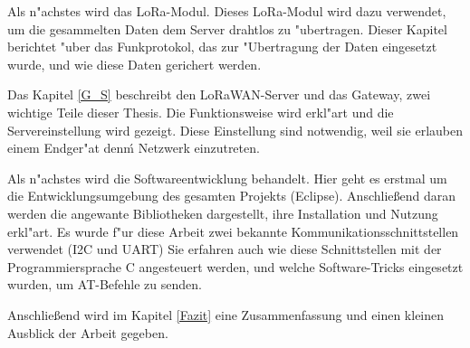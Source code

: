 Als n"achstes wird das LoRa-Modul. Dieses LoRa-Modul wird dazu 
verwendet, um die gesammelten Daten dem Server drahtlos zu "ubertragen. 
Dieser Kapitel berichtet "uber das Funkprotokol, das zur "Ubertragung 
der Daten eingesetzt wurde, und wie diese Daten gerichert werden.
 
Das Kapitel \ref{G_S} beschreibt den LoRaWAN-Server und das Gateway, 
zwei wichtige Teile dieser Thesis. Die Funktionsweise wird erkl"art und  
die Servereinstellung wird gezeigt. Diese Einstellung sind notwendig, 
weil sie erlauben einem Endger"at denḿ Netzwerk einzutreten.

Als n"achstes wird die Softwareentwicklung behandelt. Hier geht es 
erstmal um die Entwicklungsumgebung des gesamten Projekts (Eclipse). 
Anschlie\ss{}end daran werden die angewante Bibliotheken dargestellt, 
ihre Installation und Nutzung erkl"art. Es wurde f"ur diese Arbeit zwei 
bekannte Kommunikationsschnittstellen verwendet (I2C und UART) Sie 
erfahren auch wie diese Schnittstellen mit der Programmiersprache C 
angesteuert werden, und welche Software-Tricks eingesetzt wurden, um 
AT-Befehle zu senden.

Anschlie\ss{}end  wird im Kapitel \ref{Fazit} eine Zusammenfassung und 
einen kleinen Ausblick der Arbeit gegeben.
   